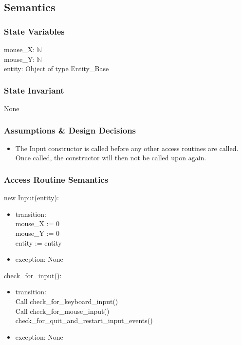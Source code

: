 \documentclass[12pt]{article}
\begin{document}
\subsection*{Semantics}
\subsubsection*{State Variables}
mouse\_X: $\mathbb{N}$\\
mouse\_Y: $\mathbb{N}$\\
entity: Object of type Entity\_Base\\

\subsubsection*{State Invariant}
None

\subsubsection*{Assumptions \& Design Decisions}
\begin{itemize}
    \item The Input constructor is called before any other access routines are called. Once called, the constructor will then not be called upon again.
\end{itemize}

\subsubsection*{Access Routine Semantics}
new Input(entity):
\begin{itemize}
    \item transition:\\
    mouse\_X := 0\\
    mouse\_Y := 0\\
    entity := entity
    \item exception: None
\end{itemize}

check\_for\_input():
\begin{itemize}
    \item transition: \\
    Call check\_for\_keyboard\_input()\\
    Call check\_for\_mouse\_input()\\
    check\_for\_quit\_and\_restart\_input\_events()\\
    \item exception: None
\end{itemize}
\end{document}
